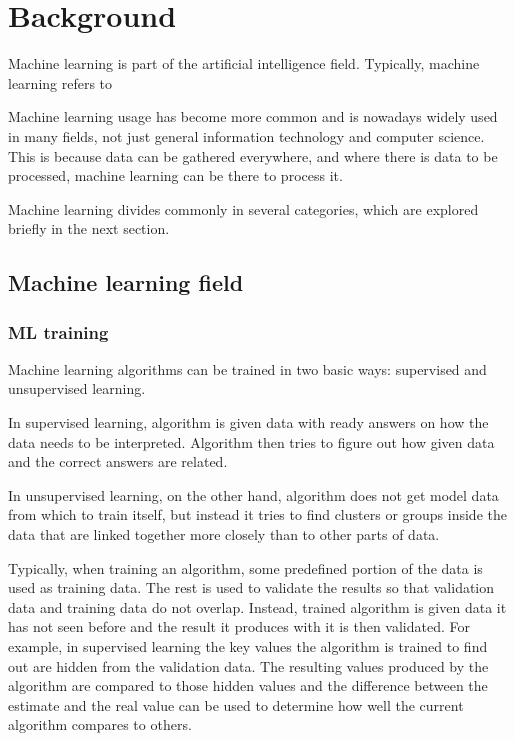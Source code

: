 
\section{Background}\label{sec:background}


Machine learning is part of the artificial intelligence field.
Typically, machine learning refers to %

Machine learning usage has become more common
and is nowadays widely used in many fields,
not just general information technology and computer science.
This is because data can be gathered everywhere,
and where there is data to be processed,
machine learning can be there to process it.

Machine learning divides commonly in several categories,
which are explored briefly in the next section.


\subsection{Machine learning field}\label{subsec:bg-ml-field}

\subsubsection*{ML training}
Machine learning algorithms can be trained in two basic ways:
supervised and unsupervised learning.

In supervised learning,
algorithm is given data with ready answers on
how the data needs to be interpreted.
Algorithm then tries to figure out
how given data and the correct answers are related.

In unsupervised learning,
on the other hand,
algorithm does not get model data from which to train itself,
but instead it tries to find clusters or groups inside the data
that are linked together more closely than to other parts of data.

Typically,
when training an algorithm,
some predefined portion of the data
is used as training data.
The rest is used to validate the results
so that validation data and training data do not overlap.
Instead, trained algorithm is given data it has not seen before
and the result it produces with it is then validated.
For example,
in supervised learning
the key values the algorithm is trained to find out
are hidden from the validation data.
The resulting values produced by the algorithm
are compared to those hidden values
and the difference between the estimate and the real value
can be used to determine how well the current algorithm compares to others.

